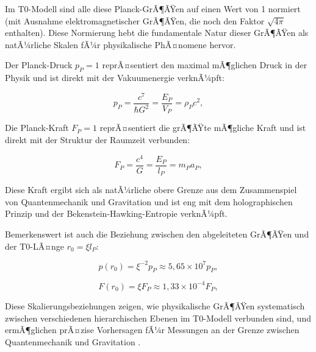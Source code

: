 ﻿\documentclass[twocolumn,aps,prl]{revtex4-2}
\begin{document}
{{{{{{{{{{{{{{{																	Im T0-Modell sind alle diese Planck-GrÃ¶ÃŸen auf einen Wert von 1 normiert (mit Ausnahme elektromagnetischer GrÃ¶ÃŸen, die noch den Faktor \(\sqrt{4\pi}\) enthalten). Diese Normierung hebt die fundamentale Natur dieser GrÃ¶ÃŸen als natÃ¼rliche Skalen fÃ¼r physikalische PhÃ¤nomene hervor.
																	
																	Der Planck-Druck \(p_P = 1\) reprÃ¤sentiert den maximal mÃ¶glichen Druck in der Physik und ist direkt mit der Vakuumenergie verknÃ¼pft:
																	
																	\begin{equation}
																		p_P = \frac{c^7}{\hbar G^2} = \frac{E_P}{V_P} = \rho_P c^2, \label{eq:planck_pressure}
																	\end{equation}
																	
																	Die Planck-Kraft \(F_P = 1\) reprÃ¤sentiert die grÃ¶ÃŸte mÃ¶gliche Kraft und ist direkt mit der Struktur der Raumzeit verbunden:
																	
																	\begin{equation}
																		F_P = \frac{c^4}{G} = \frac{E_P}{l_P} = m_P a_P, \label{eq:planck_force}
																	\end{equation}
																	
																	Diese Kraft ergibt sich als natÃ¼rliche obere Grenze aus dem Zusammenspiel von Quantenmechanik und Gravitation und ist eng mit dem holographischen Prinzip und der Bekenstein-Hawking-Entropie verknÃ¼pft.
																	
																	Bemerkenswert ist auch die Beziehung zwischen den abgeleiteten GrÃ¶ÃŸen und der T0-LÃ¤nge \(r_0 = \xi l_P\):
																	
																	\begin{equation}
																		p(r_0) = \xi^{-2} p_P \approx 5{,}65 \times 10^7 p_P, \label{eq:r0_pressure}
																	\end{equation}
																	
																	\begin{equation}
																		F(r_0) = \xi F_P \approx 1{,}33 \times 10^{-4} F_P, \label{eq:r0_force}
																	\end{equation}
																	
																	Diese Skalierungsbeziehungen zeigen, wie physikalische GrÃ¶ÃŸen systematisch zwischen verschiedenen hierarchischen Ebenen im T0-Modell verbunden sind, und ermÃ¶glichen prÃ¤zise Vorhersagen fÃ¼r Messungen an der Grenze zwischen Quantenmechanik und Gravitation \cite{pascher_emergente_2025}.
																	
}}}}}}}}}}}}}}}
\end{document}
